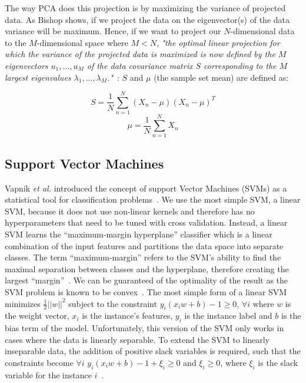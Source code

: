\documentclass{article} %
\begin{document}
The way PCA does this projection is by maximizing the variance of projected 
data. As Bishop \cite{bishop2006pattern} shows, if we project the 
data on the eigenvector(s) of the data variance will be maximum. Hence, if we want 
to project our $N$-dimensional data to the $M$-dimensional space where $M<N$, 
\textit{"the optimal linear projection for which the variance of the 
projected data is maximized is now defined by the $M$ eigenvectors 
$u_{1}, ... , u_{M}$ of the data covariance matrix $S$ corresponding to the
$M$ largest eigenvalues $\lambda_{1}, ... ,\lambda_{M}$."}~\cite{bishop2006pattern}: 
$S$ and $\mu$ (the sample set mean) are defined as:

\begin{multicols}{2}
\begin{equation}
S = \frac{1}{N} \sum_{n=1}^{N}(X_{n}-\mu)(X_{n}-\mu)^T
\end{equation}\break
\begin{equation}
\mu = \frac{1}{N} \sum_{n=1}^{N}X_{n}
\end{equation}
\end{multicols}


\subsection{Support Vector Machines}
Vapnik \emph{et al.} introduced the concept of support 
Vector Machines (SVMs) as a statistical tool for 
classification problems~\cite{shmilovici2005support}. We
use the most simple SVM, a linear SVM, because it does not use non-linear
kernels and therefore has no hyperparameters that need to be tuned
with cross validation. Instead, a linear SVM learns the ``maximum-margin
hyperplane'' classifier which is a linear combination of the input 
features and partitions the data space into separate classes. The term 
``maximum-margin'' refers to the SVM's ability to find the maximal 
separation between classes and the hyperplane, therefore creating the 
largest ``margin''~\cite{shmilovici2005support}. We can be guaranteed of
the optimality of the result as the SVM problem is known to be 
convex~\cite{burges1998tutorial}. The most simple form of a linear SVM 
minimizes $\frac{1}{2}||w||^2$ subject to the constraint 
$y_i (x_i w + b) - 1 \ge 0 $, $\forall i$ where $w$ is the weight vector,
$x_i$ is the instance's features, $y_i$ is the instance label and $b$ is
the bias term of the model. Unfortunately, this version of the SVM only
works in cases where the data is linearly separable. To extend the SVM
to linearly inseparable data, the addition of positive slack variables is
required, such that the constraints become $\forall i$
$y_i (x_i w + b) - 1 + \xi_i \ge 0 $ and $\xi_i \ge 0$, where $\xi_i$ is 
the slack variable for the instance $i$~\cite{burges1998tutorial}.
\end{document}
